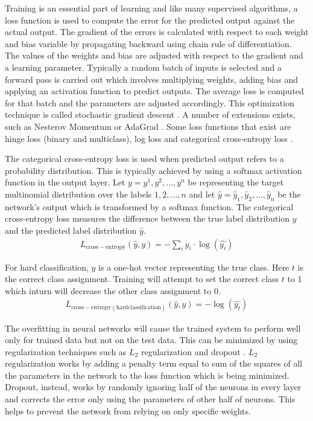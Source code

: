 \documentclass[a4paper, 11pt]{article}
\begin{document}
Training is an essential part of learning and like many supervised algorithms, a loss function is used to compute the error for the predicted output against the actual output. The gradient of the errors is calculated with respect to each weight and bias variable by propagating backward using chain rule of differentiation. The values of the weights and bias are adjusted with respect to the gradient and a learning parameter. Typically a random batch of inputs is selected and a forward pass is carried out which involves multiplying weights, adding bias and applying an activation function to predict outputs. The average loss is computed for that batch and the parameters are adjusted accordingly. This optimization technique is called stochastic gradient descent \parencite{Bottou2012}. A number of extensions exists, such as Nesterov Momentum \parencite{Sutskever2013} or AdaGrad \parencite{Duchi2011}. Some loss functions that exist are hinge loss (binary and multiclass), log loss and categorical cross-entropy loss \parencite{Goldberg2016}. 


The categorical cross-entropy loss is used when predicted output refers to a probability distribution. This is typically achieved by using a softmax activation function in the output layer. Let $y = y^{1}, y^{2}, \dots, y^{n}$ be representing the target multinomial distribution over the labels $1,2,\dots,n$ and let $ \hat{y} = \hat{y}_{1},\hat{y}_{2},\dots,\hat{y}_{n}$ be the network's output which is transformed by a softmax function. The categorical cross-entropy loss measures the difference between the true label distribution $y$ and the predicted label distribution $\hat{y}$. 
\begin{align*}
L_\mathrm{cross-entropy}(\hat{y},y) = -\sum_iy_i \cdot \log(\hat{y_i})
\end{align*}

For hard classification, $y$ is a one-hot vector representing the true class. Here $t$ is the correct class assignment. Training will attempt to set the correct class $t$ to 1 which inturn will decrease the other class assignment to 0.
\begin{align*}
L_{\mathrm{cross-entropy(hard classification)}}(\hat{y},y) = -\log(\hat{y_t})
\end{align*}

The overfitting in neural networks will cause the trained system to perform well only for trained data but not on the test data. This can be minimized by using regularization techniques such as $L_2$ regularization and dropout \parencite{Hinton2012}. $L_2$ regularization works by adding a penalty term equal to sum of the squares of all the parameters in the network to the loss function which is being minimized. Dropout, instead, works by randomly ignoring half of the neurons in every layer and corrects the error only using the parameters of other half of neurons. This helps to prevent the network from relying on only specific weights.
\end{document}
